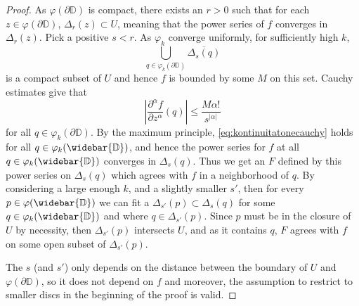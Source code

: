 \documentclass[12pt,openany]{book}
\newcommand{\abs}[1]{\left\lvert {#1} \right\rvert}
\newcommand{\D}{{\mathbb{D}}}
\theoremstyle{plain}
\theoremstyle{remark}
\theoremstyle{definition}
\theoremstyle{exercise}
\theoremstyle{example}
\begin{document}
\begin{proof}
As $\varphi(\partial \D)$ is compact, there exists an $r > 0$ such that
for each $z \in \varphi(\partial \D)$, $\Delta_r(z) \subset U$, meaning that
the power series of $f$ converges in $\Delta_r(z)$.
Pick a positive $s < r$.
As $\varphi_k$ converge uniformly, for sufficiently high $k$,
\begin{equation*}
\bigcup_{q \in \varphi_k(\partial \D)} \overline{\Delta_s(q)}
\end{equation*}
is a compact subset of $U$ and hence $f$ is bounded by some $M$ on this set.
Cauchy estimates give that
\begin{equation} \label{eq:kontinuitatonecauchy}
\abs{\frac{\partial^\alpha f}{\partial z^\alpha}(q)}
\leq
\frac{M \alpha!}{s^{\abs{\alpha}}}
\end{equation}
for all $q \in \varphi_k(\partial \D)$.  By the maximum principle,
\eqref{eq:kontinuitatonecauchy} holds for all $q \in \varphi_k(\widebar{\D})$,
and hence the power series for $f$ at all $q \in \varphi_k(\widebar{\D})$
converges in $\Delta_s(q)$.
Thus we get an $F$ defined by this power series on $\Delta_s(q)$ which
agrees with $f$ in a neighborhood of $q$.
By considering a large enough $k$, and a slightly smaller $s'$,
then for every $p \in \varphi(\widebar{\D})$ we can fit a $\Delta_{s'}(p)
\subset \Delta_s(q)$ for some $q \in \varphi_k(\widebar{\D})$ and where
$q \in \Delta_{s'}(p)$.
Since $p$ must be in the closure of $U$ by necessity, then $\Delta_{s'}(p)$
intersects $U$, and as it contains $q$, $F$ agrees with $f$ on some open
subset of $\Delta_{s'}(p)$.

The $s$ (and $s'$) only depends on the distance between the boundary of $U$
and $\varphi(\partial \D)$, so it does not depend on $f$ and moreover,
the assumption to restrict to smaller discs in the beginning of the proof
is valid.
\end{proof}
\end{document}

